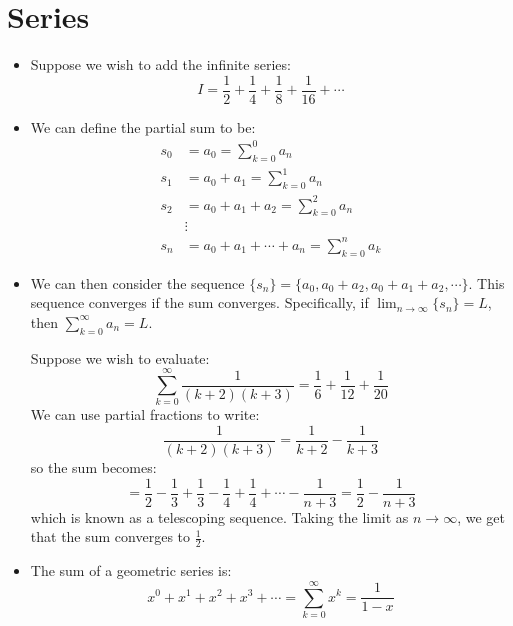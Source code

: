 \section{Series}
\begin{itemize}
    \item Suppose we wish to add the infinite series:
    \begin{equation}
        I = \frac{1}{2} + \frac{1}{4} + \frac{1}{8} + \frac{1}{16} + \cdots
    \end{equation}
    \item We can define the partial sum to be:
    \begin{align}
        s_0 &= a_0 = \sum_{k=0}^0 a_n \\ 
        s_1 &= a_0 + a_1 = \sum_{k=0}^1 a_n \\ 
        s_2 &= a_0 + a_1 + a_2 = \sum_{k=0}^2 a_n \\ 
        &\vdots \\ 
        s_n &= a_0+a_1+\cdots+a_n = \sum_{k=0}^n a_k
    \end{align}
    \item We can then consider the sequence $\{s_n\} = \{a_0, a_0+a_2, a_0+a_1+a_2, \cdots\}$. This sequence converges if the sum converges. Specifically, if $\lim_{n\to\infty}\{s_n\}=L$, then $\sum_{k=0}^\infty a_n = L$.
    \begin{example}
        Suppose we wish to evaluate:
        \begin{equation}
            \sum_{k=0}^\infty \frac{1}{(k+2)(k+3)} = \frac{1}{6}+\frac{1}{12}+\frac{1}{20}
        \end{equation}
        We can use partial fractions to write:
        \begin{equation}
            \frac{1}{(k+2)(k+3)} = \frac{1}{k+2} - \frac{1}{k+3}
        \end{equation}
        so the sum becomes:
        \begin{equation}
            =\frac{1}{2}-\frac{1}{3}+\frac{1}{3}-\frac{1}{4}+\frac{1}{4}+\cdots -\frac{1}{n+3} = \frac{1}{2}-\frac{1}{n+3}
        \end{equation}
        which is known as a telescoping sequence. Taking the limit as $n\to\infty$, we get that the sum converges to $\frac{1}{2}$.
    \end{example}
    \item The sum of a geometric series is:
    \begin{equation}
        x^0+x^1+x^2+x^3+\cdots = \sum_{k=0}^\infty x^k = \frac{1}{1-x}

\end{equation}
\end{itemize}
